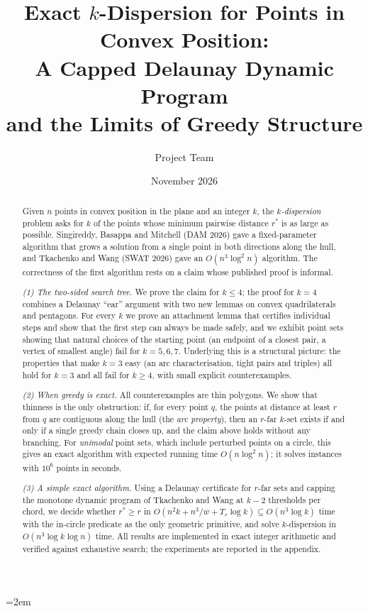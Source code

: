 \documentclass[11pt,a4paper]{article}
\title{Exact $k$-Dispersion for Points in Convex Position:\\
A Capped Delaunay Dynamic Program\\ and the Limits of Greedy Structure}
\author{Project Team}
\date{November 2026}
\theoremstyle{definition}
\theoremstyle{remark}
\newcommand{\rstar}{r^{*}}
\newcommand{\Tr}{T_r}
\begin{document}
\emergencystretch=2em
\maketitle

\begin{abstract}
Given $n$ points in convex position in the plane and an integer $k$, the
\emph{$k$-dispersion} problem asks for $k$ of the points whose minimum pairwise
distance $\rstar$ is as large as possible. Singireddy, Basappa and Mitchell
(DAM 2026) gave a fixed-parameter algorithm that grows a solution from a
single point in both directions along the hull, and Tkachenko and Wang (SWAT
2026) gave an $O(n^3\log^2n)$ algorithm. The correctness of the first
algorithm rests on a claim whose published proof is informal.

\emph{(1) The two-sided search tree.} We prove the claim for $k\le4$; the
proof for $k=4$ combines a Delaunay ``ear'' argument with two new
lemmas on convex quadrilaterals and pentagons. For every $k$ we prove an
attachment lemma that certifies individual steps and show that the first step
can always be made safely, and we exhibit point sets showing that natural
choices of the starting point (an endpoint of a closest pair, a vertex of
smallest angle) fail for $k=5,6,7$. Underlying this is a structural picture:
the properties that make $k=3$ easy (an arc characterisation, tight pairs and
triples) all hold for $k=3$ and all fail for $k\ge4$, with small explicit
counterexamples.

\emph{(2) When greedy is exact.} All counterexamples are thin polygons. We show
that thinness is the only obstruction: if, for every point $q$, the points at
distance at least $r$ from $q$ are contiguous along the hull (the \emph{arc
property}), then an $r$-far $k$-set exists if and only if a single greedy
chain closes up, and the claim above holds without any branching. For
\emph{unimodal} point sets, which include perturbed points on a circle, this
gives an exact algorithm with expected running time $O(n\log^2n)$; it solves
instances with $10^6$ points in seconds.

\emph{(3) A simple exact algorithm.} Using a Delaunay certificate for
$r$-far sets and capping the monotone dynamic program of Tkachenko and Wang at
$k-2$ thresholds per chord, we decide whether $\rstar\ge r$ in
$O(n^2k+n^3/w+\Tr\log k)\subseteq O(n^3\log k)$ time with the in-circle
predicate as the only geometric primitive, and solve $k$-dispersion in
$O(n^3\log k\log n)$ time. All results are implemented in exact integer
arithmetic and verified against exhaustive search; the experiments are
reported in the appendix.
\end{abstract}
\end{document}
